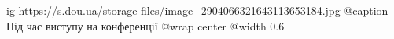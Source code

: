  
 
 
 
 

\ifcmt
  ig https://s.dou.ua/storage-files/image_2904066321643113653184.jpg
	@caption Під час виступу на конференції
	@wrap center
	@width 0.6
\fi
